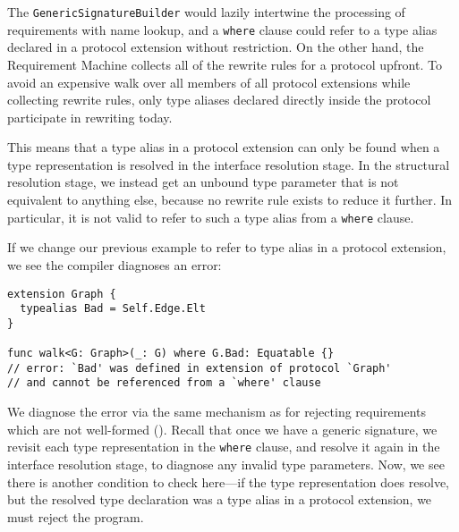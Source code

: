 \documentclass[../generics]{subfiles}
\begin{document}
\begin{example}
The \texttt{GenericSignatureBuilder} would lazily intertwine the processing of requirements with name lookup, and a \texttt{where} clause could refer to a type alias declared in a protocol extension without restriction. On the other hand, the Requirement Machine collects all of the rewrite rules for a protocol upfront. To avoid an expensive walk over all members of all protocol extensions while collecting rewrite rules, only type aliases declared directly inside the protocol participate in rewriting today.

This means that a type alias in a protocol extension can only be found when a type representation is resolved in the interface resolution stage. In the structural resolution stage, we instead get an unbound type parameter that is not equivalent to anything else, because no rewrite rule exists to reduce it further. In particular, it is not valid to refer to such a type alias from a \texttt{where} clause.

If we change our previous example to refer to type alias in a protocol extension, we see the compiler diagnoses an error:
\begin{Verbatim}
extension Graph {
  typealias Bad = Self.Edge.Elt
}

func walk<G: Graph>(_: G) where G.Bad: Equatable {}
// error: `Bad' was defined in extension of protocol `Graph'
// and cannot be referenced from a `where' clause
\end{Verbatim}
We diagnose the error via the same mechanism as for rejecting requirements which are not well-formed (). Recall that once we have a generic signature, we revisit each type representation in the \texttt{where} clause, and resolve it again in the interface resolution stage, to diagnose any invalid type parameters. Now, we see there is another condition to check here---if the type representation does resolve, but the resolved type declaration was a type alias in a protocol extension, we must reject the program.
\end{example}
\end{document}

